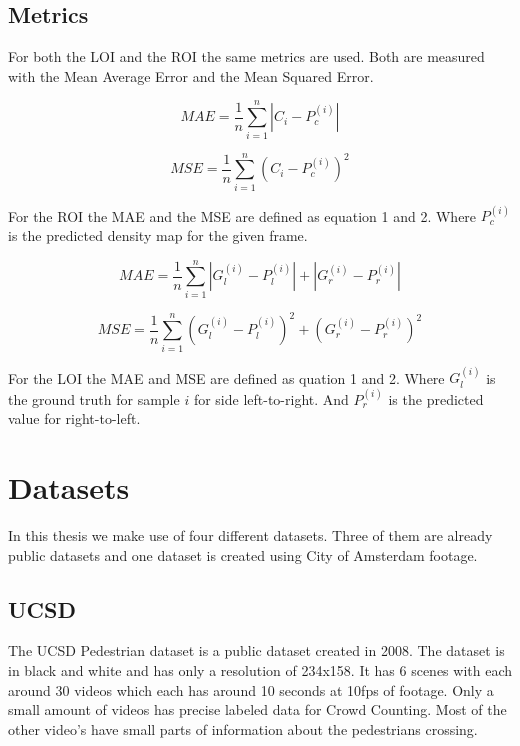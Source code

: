 \subsection{Metrics}
For both the LOI and the ROI the same metrics are used. Both are measured with the Mean Average Error and the Mean Squared Error.

\begin{equation}
\label{eq:mae_roi}
	MAE = \frac{1}{n}\sum^n_{i=1}|C_i-P_c^{(i)}|
\end{equation}

\begin{equation}
\label{eq:mse_roi}
	MSE = \frac{1}{n}\sum^n_{i=1}(C_i-P_c^{(i)})^2
\end{equation}

For the ROI the MAE and the MSE are defined as equation 1 and 2. Where $P_c^{(i)}$ is the predicted density map for the given frame.

\begin{equation}
\label{eq:mae_loi}
	MAE = \frac{1}{n}\sum^n_{i=1}|G_l^{(i)}-P_l^{(i)}|+|G_r^{(i)}-P_r^{(i)}|
\end{equation}

\begin{equation}
\label{eq:mse_loi}
	MSE = \frac{1}{n}\sum^n_{i=1}(G_l^{(i)}-P_l^{(i)})^2+(G_r^{(i)}-P_r^{(i)})^2
\end{equation}

For the LOI the MAE and MSE are defined as quation 1 and 2. Where $G_l^{(i)}$ is the ground truth for sample $i$ for side left-to-right. And $P_r^{(i)}$ is the predicted value for right-to-left.

\section{Datasets}
In this thesis we make use of four different datasets. Three of them are already public datasets and one dataset is created using City of Amsterdam footage.

\subsection{UCSD}
The UCSD Pedestrian dataset \cite{Chan2008} is a public dataset created in 2008. The dataset is in black and white and has only a resolution of 234x158. It has 6 scenes with each around 30 videos which each has around 10 seconds at 10fps of footage. Only a small amount of videos has precise labeled data for Crowd Counting. Most of the other video's have small parts of information about the pedestrians crossing.

